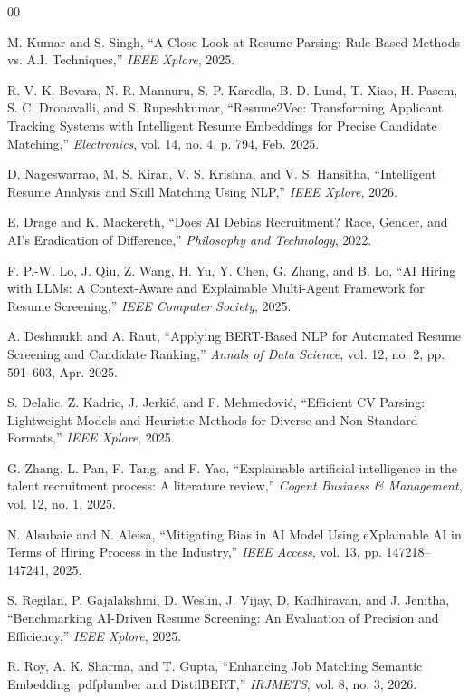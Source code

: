 \balance
\begingroup
\footnotesize
\begin{thebibliography}{00}

 M. Kumar and S. Singh, ``A Close Look at Resume Parsing: Rule-Based Methods vs. A.I. Techniques,'' \textit{IEEE Xplore}, 2025.

 R. V. K. Bevara, N. R. Mannuru, S. P. Karedla, B. D. Lund, T. Xiao, H. Pasem, S. C. Dronavalli, and S. Rupeshkumar, ``Resume2Vec: Transforming Applicant Tracking Systems with Intelligent Resume Embeddings for Precise Candidate Matching,'' \textit{Electronics}, vol. 14, no. 4, p. 794, Feb. 2025.

 D. Nageswarrao, M. S. Kiran, V. S. Krishna, and V. S. Hansitha, ``Intelligent Resume Analysis and Skill Matching Using NLP,'' \textit{IEEE Xplore}, 2026.

 E. Drage and K. Mackereth, ``Does AI Debias Recruitment? Race, Gender, and AI's Eradication of Difference,'' \textit{Philosophy and Technology}, 2022.

 F. P.-W. Lo, J. Qiu, Z. Wang, H. Yu, Y. Chen, G. Zhang, and B. Lo, ``AI Hiring with LLMs: A Context-Aware and Explainable Multi-Agent Framework for Resume Screening,'' \textit{IEEE Computer Society}, 2025.

 A. Deshmukh and A. Raut, ``Applying BERT-Based NLP for Automated Resume Screening and Candidate Ranking,'' \textit{Annals of Data Science}, vol. 12, no. 2, pp. 591--603, Apr. 2025.

 S. Delalic, Z. Kadric, J. Jerkić, and F. Mehmedović, ``Efficient CV Parsing: Lightweight Models and Heuristic Methods for Diverse and Non-Standard Formats,'' \textit{IEEE Xplore}, 2025.

 G. Zhang, L. Pan, F. Tang, and F. Yao, ``Explainable artificial intelligence in the talent recruitment process: A literature review,'' \textit{Cogent Business \& Management}, vol. 12, no. 1, 2025.

 N. Alsubaie and N. Aleisa, ``Mitigating Bias in AI Model Using eXplainable AI in Terms of Hiring Process in the Industry,'' \textit{IEEE Access}, vol. 13, pp. 147218--147241, 2025.

 S. Regilan, P. Gajalakshmi, D. Weslin, J. Vijay, D. Kadhiravan, and J. Jenitha, ``Benchmarking AI-Driven Resume Screening: An Evaluation of Precision and Efficiency,'' \textit{IEEE Xplore}, 2025.

 R. Roy, A. K. Sharma, and T. Gupta, ``Enhancing Job Matching Semantic Embedding: pdfplumber and DistilBERT,'' \textit{IRJMETS}, vol. 8, no. 3, 2026.


\end{thebibliography}
